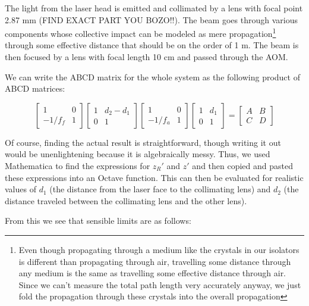 The light from the laser head is emitted and collimated by a lens with focal point 2.87 mm (FIND EXACT PART YOU BOZO!!). The beam goes through various components whose collective impact can be modeled as mere propagation\footnote{Even though propagating through a medium like the crystals in our isolators is different than propagating through air, travelling some distance through any medium is the same as travelling some effective distance through air. Since we can't measure the total path length very accurately anyway, we just fold the propagation through these crystals into the overall propagation}
through some effective distance that should be on the order of 1 m. The beam is then focused by a lens with focal length 10 cm and passed through the AOM. 

We can write the ABCD matrix for the whole system as the following product of ABCD matrices: 

\begin{equation}
\begin{bmatrix}
1 & 0 \\ -1/f_{f} & 1
\end{bmatrix}
\begin{bmatrix}
1 & d_2-d_1 \\ 0 & 1
\end{bmatrix}
\begin{bmatrix}
1 & 0 \\ -1/f_{a} & 1
\end{bmatrix}
\begin{bmatrix}
1 & d_1 \\ 0 & 1
\end{bmatrix}
=
\begin{bmatrix}
A & B \\ C & D
\end{bmatrix}
\end{equation}

Of course, finding the actual result is straightforward, though writing it out would be unenlightening because it is algebraically messy. Thus, we used Mathematica to find the expressions for $z_R'$ and $z'$ and then copied and pasted these expressions into an Octave function. This can then be evaluated for realistic values of $d_1$ (the distance from the laser face to the collimating lens) and $d_2$ (the distance traveled between the collimating lens and the other lens). 

From this we see that sensible limits are as follows: 





